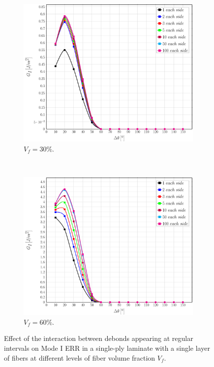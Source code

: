 \documentclass[review]{elsarticle}
\begin{document}
\begin{figure}[!h]
\centering
    \begin{subfigure}[b]{0.475\textwidth}
        \includegraphics[width=\textwidth]{sidefibers-vf30-GI.pdf}
        \caption{$V_{f}=30\%$.}\label{subfig:sidefiber30MI}
    \end{subfigure} ~
    \begin{subfigure}[b]{0.475\textwidth}
        \includegraphics[width=\textwidth]{sidefibers-vf60-GI.pdf}
        \caption{$V_{f}=60\%$.}\label{subfig:sidefiber60MI}
    \end{subfigure}

\caption{Effect of the interaction between debonds appearing at regular intervals on Mode I ERR in a single-ply laminate with a single layer of fibers at different levels of fiber volume fraction $V_{f}$.}\label{fig:sidefibersMI}
\end{figure}
\end{document}
